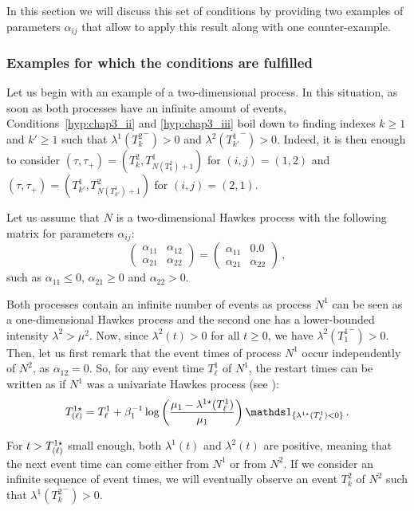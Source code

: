     In this section we will discuss this set of conditions by providing two examples of parameters $\alpha_{ij}$ that allow to apply this result along with one counter-example.

\subsubsection{Examples for which the conditions are fulfilled}
    Let us begin with an example of a two-dimensional process.
    In this situation, as soon as both processes have an infinite amount of events,
    Conditions~\ref{hyp:chap3_ii} and \ref{hyp:chap3_iii} boil down to finding indexes \(k\ge1\) and \(k'\ge1\) such that \(\lambda^1({T_k^2}^-)>0\) and \(\lambda^2({T_{k'}^1}^-)>0\).
    Indeed, it is then enough to consider \((\tau, \tau_+) = (T_k^2, T_{N(T_k^2)+1}^1)\) for \((i, j)=(1, 2)\) and \((\tau, \tau_+) = (T_{k'}^1, T_{N(T_{k'}^1)+1}^2)\) for \((i, j)=(2, 1)\).

    \begin{example}\label{ex:chap3_2dim_identifiability}
        Let us assume that $N$ is a two-dimensional Hawkes process with the following matrix for parameters $\alpha_{ij}$:
        \[\begin{pmatrix}
                      \alpha_{11} & \alpha_{12}\\
                      \alpha_{21} & \alpha_{22}
                      \end{pmatrix}=
                      \begin{pmatrix}
                      \alpha_{11} & 0.0\\
                      \alpha_{21} & \alpha_{22}
                      \end{pmatrix}\,,\]
        such as $\alpha_{11} \leq 0$, $\alpha_{21} \geq 0$ and $\alpha_{22} > 0$.

        Both processes contain an infinite number of events as process $N^1$ can be seen as a one-dimensional Hawkes process and the second one has a lower-bounded intensity $\lambda^2 > \mu^2$.
        Now, since \(\lambda^2(t)>0\) for all \(t\ge0\), we have \(\lambda^2({T_1^1}^-)>0\).
        Then, let us first remark that the event times of process $N^1$ occur independently of $N^2$, as $\alpha_{12} = 0$.
        So, for
        any event time $T_{\ell}^1$ of $N^1$, the restart times can be written as if $N^1$ was a univariate Hawkes process (see \textcite{bonnet2021}):
\[T\park[\ell]^{1\star} = T_\ell^1 + \beta_1^{-1}\log\left(  \frac{\mu_1 - \lambda^{1\star}(T_\ell^1)}{\mu_1}  \right)\II_{\{\lambda^{1\star}(T_\ell^1) < 0\}}\,.\]

        For $t > T\park[\ell]^{1\star}$ small enough, both $\lambda^1(t)$ and $\lambda^2(t)$ are positive,
        meaning that the next event time can come either from \(N^1\) or from \(N^2\).
        If we consider an infinite sequence of event times, we will eventually observe an event \(T_k^2\) of $N^2$ such that $\lambda^1({T_k^2}^-)>0$.
       
    \end{example}

